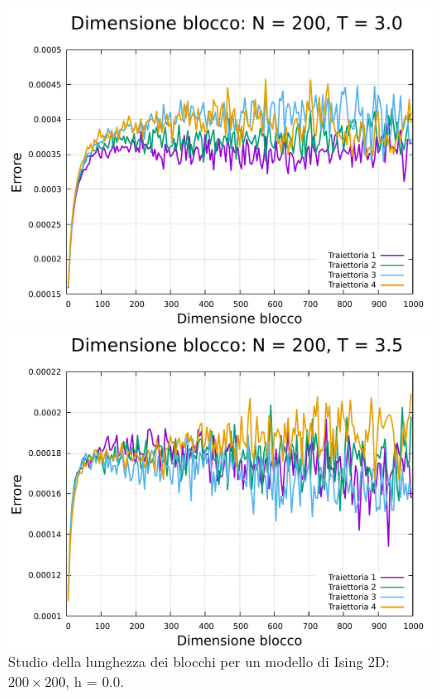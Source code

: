 \begin{figure}[H]
    \begin{minipage}{0.45\textwidth}  
        \centering
        \includegraphics[page=1, width=\textwidth]{Immagini/simIsing2D/metro/lblk/err_200_3.0.pdf}
        \caption{$T\,=\,3.0$}
      \end{minipage}\hfill
      \begin{minipage}{0.45\textwidth}  
        \centering
        \includegraphics[page=1, width=\textwidth]{Immagini/simIsing2D/metro/lblk/err_200_3.5.pdf}
        \caption{$T\,=\,3.5$}
    \end{minipage}

    \caption{Studio della lunghezza dei blocchi per un modello di Ising 2D: $200 \times 200$, h = 0.0.}
\end{figure}

